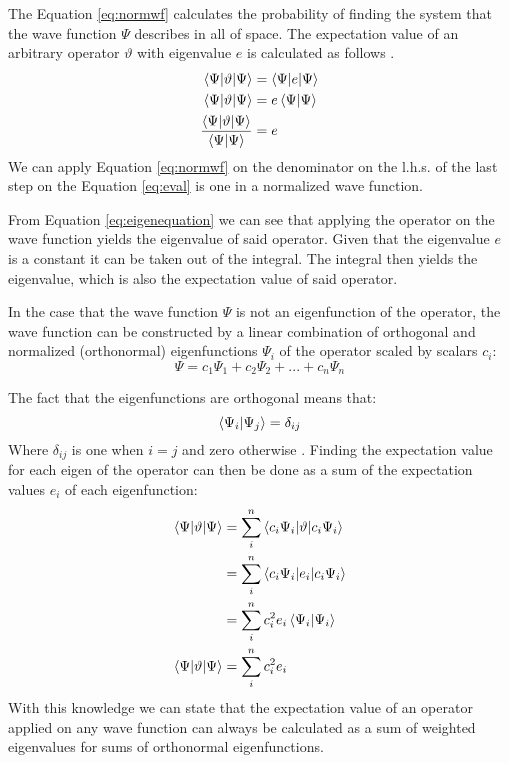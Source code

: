 \documentclass[../master_thesis.tex]{subfiles}
\begin{document}
The Equation \ref{eq:normwf} calculates the probability of finding the system
that the wave function $\Psi$ describes in all of space. The expectation value
of an arbitrary operator $\vartheta$ with eigenvalue $e$ is calculated as
follows \cite{Atkins:2014}.
\begin{align}
  \begin{split}
    \braket{\Psi|\vartheta|\Psi} &= \braket{\Psi|e|\Psi} \\
    \braket{\Psi|\vartheta|\Psi}&= e\braket{\Psi|\Psi} \\
    \frac{\braket{\Psi|\vartheta|\Psi}}{\braket{\Psi|\Psi}}&= e\label{eq:eval}
  \end{split}
\end{align}
We can apply Equation \ref{eq:normwf} on the denominator on the l.h.s. of the
last step on the Equation \ref{eq:eval} is one in a normalized wave function.

From Equation \ref{eq:eigenequation} we can see that applying the operator on
the wave function yields the eigenvalue of said operator. Given that the
eigenvalue $e$ is a constant it can be taken out of the integral. The integral
then yields the eigenvalue, which is also the expectation value of said
operator.

In the case that the wave function $\Psi$ is not an eigenfunction of the
operator, the wave function can be constructed by a linear combination of
orthogonal and normalized (orthonormal\cite{Jensen:2017}) eigenfunctions
$\Psi_i$ of the operator \cite{Atkins:2014} scaled by scalars $c_i$:
\begin{equation}
  \Psi = c_1\Psi_1 + c_2\Psi_2 + ... + c_n\Psi_n \label{eq:lincomb}
\end{equation}

The fact that the eigenfunctions are orthogonal means that:
\begin{equation}
  \braket{\Psi_i|\Psi_j} = \delta _{ij}
\end{equation}
Where $ \delta_{ij} $ is one when $i=j$ and zero otherwise \cite{Cramer:2004}.
Finding the expectation value for each eigen of the operator can then be done
as a sum of the expectation values $e_i$ of each eigenfunction:
\begin{align}
  \begin{split}
    \braket{\Psi|\vartheta|\Psi} &=
    \sum\limits_i^n\braket{c_i\Psi_i|\vartheta|c_i\Psi_i} \\
    &= \sum\limits_i^n\braket{c_i\Psi_i|e_i|c_i\Psi_i} \\
    &= \sum\limits_i^nc_i^2e_i\braket{\Psi_i|\Psi_i} \\
    \braket{\Psi|\vartheta|\Psi} &= \sum\limits_i^nc_i^2e_i\label{eq:arbeval}
  \end{split}
\end{align}
With this knowledge we can state that the expectation value of an operator
applied on any wave function can always be calculated as a sum of weighted
eigenvalues for sums of orthonormal eigenfunctions.
\end{document}
